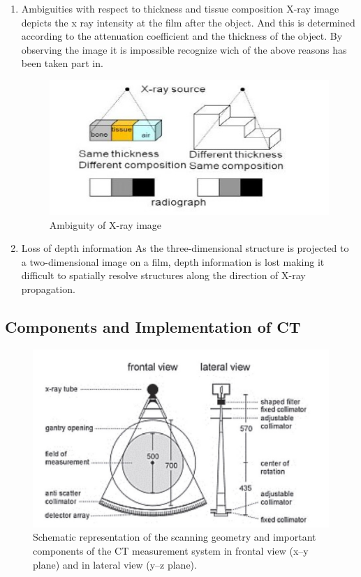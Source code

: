 \documentclass[12pt]{article}
\begin{document}
\begin{enumerate}
    \item Ambiguities with respect to thickness and tissue composition\newline
    X-ray image depicts the x ray intensity at the film after the object. And this is determined according to the attenuation coefficient and the thickness of the object. By observing the image it is impossible recognize wich of the above reasons has been taken part in.
    \begin{figure}[h!]
        \centering
        \includegraphics[width=0.65\linewidth]{x2.jpg}
        \caption{\small{Ambiguity of X-ray image}}
        \label{fig:Ambiguity of X-ray image}
    \end{figure}
    
    \newline
    \item Loss of depth information\newline
    As the three-dimensional structure is projected to a two-dimensional image on a film, depth information is lost making it difficult to spatially resolve structures along the direction of X-ray propagation.
    
\end{enumerate}
\pagebreak

\subsection{Components and Implementation of CT}
\begin{figure}[h!]
    \centering
    \includegraphics[width=0.85\linewidth]{ct1.jpg}
    \caption{\small{Schematic representation of the scanning geometry and important components of the
CT measurement system in frontal view (x–y plane) and in lateral view (y–z plane).}}
    \label{fig:Schematic representation of the scanning geometry and important components}
\end{figure}
\end{document}
